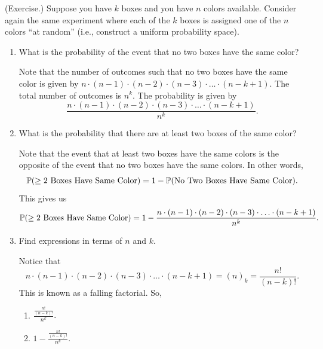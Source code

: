\documentclass[letterpaper]{article}
\begin{document}
\begin{mdframed}
    (Exercise.) Suppose you have $k$ boxes and you have $n$ colors available. Consider again the same experiment where each of the $k$ boxes is assigned one of the $n$ colors ``at random'' (i.e., construct a uniform probability space).
    \begin{enumerate}
        \item What is the probability of the event that no two boxes have the same color? 
        \begin{mdframed}
            Note that the number of outcomes such that no two boxes have the same color is given by $n \cdot (n - 1) \cdot (n - 2) \cdot (n - 3) \cdot \hdots \cdot (n - k + 1)$. The total number of outcomes is $n^k$. The probability is given by \[\frac{n \cdot (n - 1) \cdot (n - 2) \cdot (n - 3) \cdot \hdots \cdot (n - k + 1)}{n^k}.\]
        \end{mdframed}
        \item What is the probability that there are at least two boxes of the same color? 
        \begin{mdframed}
            Note that the event that at least two boxes have the same colors is the opposite of the event that no two boxes have the same colors. In other words, 
            \[\mathbb{P}(\geq 2\text{ Boxes Have Same Color}) = 1 - \mathbb{P}(\text{No Two Boxes Have Same Color}).\]
            This gives us 
            \[\mathbb{P}(\geq 2\text{ Boxes Have Same Color}) = 1 - \frac{n \cdot (n - 1) \cdot (n - 2) \cdot (n - 3) \cdot \hdots \cdot (n - k + 1)}{n^k}.\]
        \end{mdframed}
        \item Find expressions in terms of $n$ and $k$. 
        \begin{mdframed}
            Notice that 
            \[n \cdot (n - 1) \cdot (n - 2) \cdot (n - 3) \cdot \hdots \cdot (n - k + 1) = (n)_k = \frac{n!}{(n - k)!}.\] This is known as a falling factorial. So, 
            \begin{enumerate}
                \item $\frac{\frac{n!}{(n - k)!}}{n^k}$.
                \item $1 - \frac{\frac{n!}{(n - k)!}}{n^k}$.
            \end{enumerate}
        \end{mdframed}
    \end{enumerate}
\end{mdframed}
\end{document}
